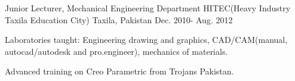 \begin{cventries}



  \cventry
    {Junior Lecturer, Mechanical Engineering Department} %
    {HITEC(Heavy Industry Taxila Education City)} %
    {Taxila, Pakistan} %
    {Dec. 2010- Aug. 2012} %
    {
      \begin{cvitems} %
        \item {Laboratories taught: Engineering drawing and graphics, CAD/CAM(manual, autocad/autodesk and pro.engineer), mechanics of materials.} 
        \item {Advanced training on Creo Parametric from Trojans Pakistan.}
      \end{cvitems}
    }




\end{cventries}